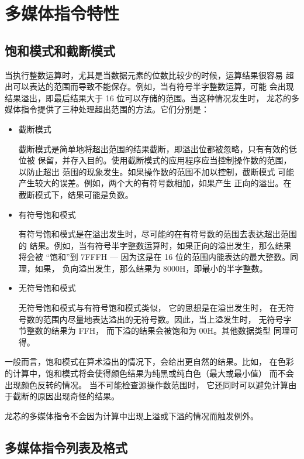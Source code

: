 \section{多媒体指令特性}

\subsection{饱和模式和截断模式}

当执行整数运算时，尤其是当数据元素的位数比较少的时候，运算结果很容易
超出可以表达的范围而导致不能保存。例如，当有符号半字整数运算，可能
会出现结果溢出，即最后结果大于 16 位可以存储的范围。当这种情况发生时，
龙芯的多媒体指令提供了三种处理超出范围的方法。它们分别是：
\begin{itemize}
  \item 截断模式

    截断模式是简单地将超出范围的结果截断，即溢出位都被忽略，只有有效的低位被
    保留，并存入目的。使用截断模式的应用程序应当控制操作数的范围，以防止超出
    范围的现象发生。如果操作数的范围不加以控制，截断模式
    可能产生较大的误差。例如，两个大的有符号数相加，如果产生
    正向的溢出。在截断模式下，结果可能是负数。

  \item 有符号饱和模式

    有符号饱和模式是在溢出发生时，尽可能的在有符号数的范围去表达超出范围的
    结果。例如，当有符号半字整数运算时，如果正向的溢出发生，那么结果将会被
    ``饱和''到 7FFFH --- 因为这是在 16 位的范围内能表达的最大整数。同理，如果，
    负向溢出发生，那么结果为 8000H，即最小的半字整数。

  \item 无符号饱和模式

    无符号饱和模式与有符号饱和模式类似， 它的思想是在溢出发生时，
    在无符号数的范围内尽量地表达溢出的无符号数。因此，当上溢发生时，
    无符号字节整数的结果为 FFH， 而下溢的结果会被饱和为 00H。其他数据类型
    同理可得。
\end{itemize}

一般而言，饱和模式在算术溢出的情况下，会给出更自然的结果。比如，
在色彩的计算中，饱和模式将会使得颜色结果为纯黑或纯白色（最大或最小值）
而不会出现颜色反转的情况。 当不可能检查源操作数范围时，
它还同时可以避免计算由于截断的原因出现奇怪的结果。

龙芯的多媒体指令不会因为计算中出现上溢或下溢的情况而触发例外。

\subsection{多媒体指令列表及格式}

